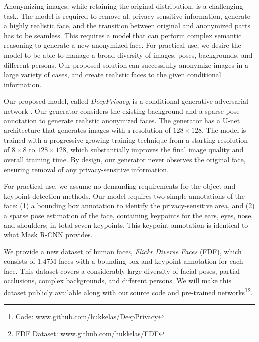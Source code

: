 \documentclass[runningheads]{llncs}
\begin{document}
Anonymizing images, while retaining the original distribution, is a challenging task. The model is required to remove all privacy-sensitive information, generate a highly realistic face, and the transition between original and anonymized parts has to be seamless. 
This requires a model that can perform complex semantic reasoning to generate  a new anonymized face.
For practical use, we desire the model to be able to manage a broad diversity of images, poses, backgrounds, and different persons. Our proposed solution can successfully anonymize images in a large variety of cases, and create realistic faces to the given conditional information. 

Our proposed model, called \textit{DeepPrivacy}, is a conditional generative adversarial  network \cite{Goodfellow2014,Mirza2014}. Our generator considers the existing background and a sparse pose annotation to generate realistic anonymized faces. 
The generator has a U-net architecture \cite{ronneberger2015u} that generates images with a resolution of $128 \times 128$. 
The model is trained with a progressive growing training technique \cite{Karras2017} from a starting resolution of $8 \times 8$ to $128 \times 128$, which substantially improves the final image quality and overall training time. 
By design, our generator never observes the original face, ensuring removal of any privacy-sensitive information.


For practical use, we assume no demanding requirements for the object and keypoint detection methods. Our model requires two simple annotations of the face: (1) a bounding box annotation to identify the privacy-sensitive area, and (2) a sparse pose estimation of the face, containing keypoints for the ears, eyes, nose, and shoulders; in total seven keypoints. This keypoint annotation is identical to what Mask R-CNN \cite{He2017} provides.

We provide a new dataset of human faces, \textit{Flickr Diverse Faces} (FDF), which consists of 1.47M faces with a bounding box and keypoint annotation for each face. This dataset covers a considerably large diversity of facial poses, partial occlusions, complex backgrounds, and different persons. We will make this dataset publicly available along with our source code and pre-trained networks\footnote{Code: \url{www.github.com/hukkelas/DeepPrivacy}}\footnote{FDF Dataset: \url{www.github.com/hukkelas/FDF}}.
\end{document}
